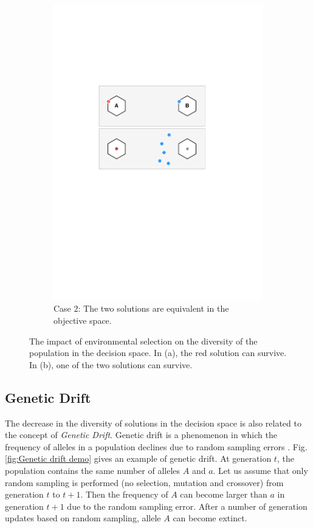 \documentclass[conference]{IEEEtran}
\begin{document}
\begin{figure}[htbp]
	\begin{subfigure}[b]{.3\textwidth}
		\includegraphics[width=\linewidth]{Section3/case2}
		\caption{Case 2: The two solutions are equivalent in the objective space.}
	\end{subfigure}
	\caption{The impact of environmental selection on the diversity of the population in the decision space. In (a), the red solution can survive. In (b), one of the two solutions can survive. }
	\label{fig: Environmental selection}
\end{figure}

\subsection{Genetic Drift}
The decrease in the diversity of solutions in the decision space is also related to the concept of \textit{Genetic Drift}. Genetic drift is a phenomenon in which the frequency of alleles in a population declines due to random sampling errors \cite{muhlenbein1993predictive}. Fig. \ref{fig:Genetic drift demo} gives an example of genetic drift. At generation $t$, the population contains the same number of alleles $A$ and $a$. Let us assume that only random sampling is performed (no selection, mutation and crossover) from generation $t$ to $t+1$. Then the frequency of $A$ can become larger than $a$ in generation $t+1$ due to the random sampling error. After a number of generation updates based on random sampling, allele $A$ can become extinct.
\end{document}
